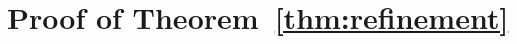 \documentclass[lettersize,onecolumn,journal]{IEEEtran}
\theoremstyle{definition}
\theoremstyle{definition}
\newtheorem{assumption}{Assumption}
\newtheorem{defn}{Definition}
\newtheorem{rmk}{Remark}
\def\fixme#1#2{\textbf{\color{red}[FIXME (#1): #2]}}
\begin{document}
\section*{Proof of Theorem~\ref{thm:refinement}}





 
 
\end{document}
